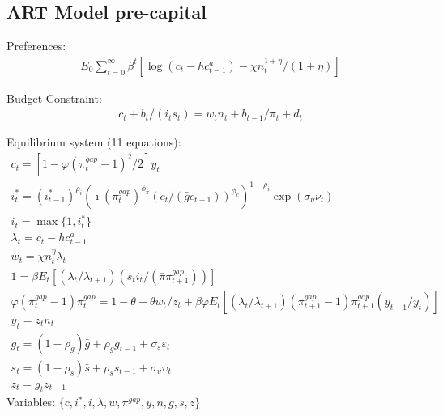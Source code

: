 \documentclass[12pt, final]{article}
\begin{document}
\subsection{ART Model pre-capital}
\noindent Preferences:
\begin{gather*}
  E_0\textstyle\sum_{t=0}^\infty\beta^t [\log(c_t-hc^a_{t-1})-\chi n_t^{1+\eta}/(1+\eta)]
\end{gather*}

\noindent Budget Constraint:
\begin{gather*}
  c_t+b_t/(i_ts_t)=w_tn_t+b_{t-1}/\pi_t+d_t
\end{gather*}

\setcounter{equation}{0}
\noindent Equilibrium system (11 equations):
\small\begin{gather}
c_t = [1-\varphi(\pi_t^{gap}-1)^2/2]y_t\\
i_t^*=(i^*_{t-1})^{\rho_i}(\bar{\imath}(\pi^{gap}_t)^{\phi_\pi}(c_t/(\bar{g}c_{t-1}))^{\phi_c})^{1-\rho_i}\exp(\sigma_\nu\nu_t)\\
i_t=\max\{1,i_t^*\}\\
\lambda_t = c_t - hc^a_{t-1} \\
w_t = \chi n_t^\eta \lambda_t\\
1 =  \beta E_t[(\lambda_t/\lambda_{t+1})(s_ti_t/(\bar{\pi}\pi_{t+1}^{gap}))]\\
\varphi(\pi_t^{gap}-1)\pi_t^{gap} = 1-\theta + \theta w_t/z_t + \beta\varphi E_t[(\lambda_t/\lambda_{t+1})(\pi_{t+1}^{gap}-1)\pi_{t+1}^{gap}(y_{t+1}/y_t)]\\
  y_t=z_t n_t\\  
  g_t= (1-\rho_g)\bar{g}+\rho_gg_{t-1} + \sigma_\varepsilon\varepsilon_t \\
  s_t=(1-\rho_s)\bar{s}+\rho_ss_{t-1} + \sigma_\upsilon\upsilon_t\\
  z_t=g_tz_{t-1}
\end{gather}\normalsize
Variables: $\{c,i^*,i,\lambda,w,\pi^{gap},y,n,g,s,z\}$\\
\end{document}
